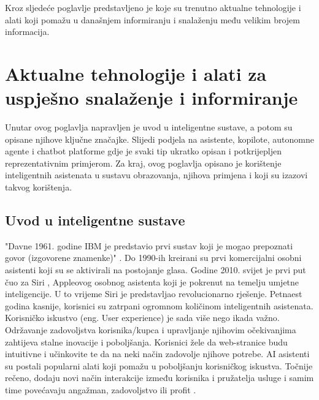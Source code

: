 \documentclass[]{foi}
\begin{document}
Kroz sljedeće poglavlje predstavljeno je koje su trenutno aktualne tehnologije i alati koji pomažu u današnjem informiranju i snalaženju među velikim brojem informacija.


\chapter{Aktualne tehnologije i alati za uspješno snalaženje i informiranje}

Unutar ovog poglavlja napravljen je uvod u inteligentne sustave, a potom su opisane njihove ključne značajke. Slijedi podjela na asistente, kopilote, autonomne agente i chatbot 
platforme gdje je svaki tip ukratko opisan i potkrijepljen reprezentativnim primjerom. Za kraj, ovog poglavlja opisano je korištenje inteligentnih asistenata u sustavu obrazovanja, njihova 
primjena i koji su izazovi takvog korištenja.

\section{Uvod u inteligentne sustave}

"Davne 1961. godine IBM je predstavio prvi sustav koji je mogao prepoznati govor (izgovorene znamenke)" \cite{buchan2024ai}. Do 1990-ih kreirani su prvi komercijalni 
osobni asistenti koji su se aktivirali na postojanje glasa. Godine 2010. svijet je prvi put čuo za Siri \cite{buchan2024ai}, Appleovog osobnog asistenta koji je 
pokrenut na temelju umjetne inteligencije. U to vrijeme Siri je predstavljao revolucionarno rješenje. Petnaest godina kasnije, korisnici su 
zatrpani ogromnom količinom inteligentnih asistenata. Korisničko iskustvo (eng. User experience) je sada više nego ikada važno. Održavanje zadovoljstva 
korisnika/kupca i upravljanje njihovim očekivanjima zahtijeva stalne inovacije i poboljšanja. Korisnici žele da web-stranice budu intuitivne i učinkovite
te da na neki način zadovolje njihove potrebe. AI asistenti su postali popularni alati koji pomažu u poboljšanju korisničkog iskustva.
Točnije rečeno, dodaju novi način interakcije između korisnika i pružatelja usluge i samim time povećavaju angažman, zadovoljstvo ili profit \cite{buchan2024ai}.
\end{document}
